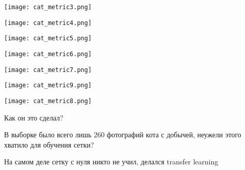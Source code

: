 \documentclass[notes,12pt, aspectratio=169]{beamer}
\newenvironment{wideitemize}{\itemize\addtolength{\itemsep}{10pt}}{\enditemize}
\begin{document}
\begin{frame}
\begin{center}
	\texttt{[image: cat\_metric3.png]}
\end{center}
\end{frame}


\begin{frame}
\begin{center}
	\texttt{[image: cat\_metric4.png]}
\end{center}
\end{frame}


\begin{frame}
\begin{center}
	\texttt{[image: cat\_metric5.png]}
\end{center}
\end{frame}


\begin{frame}
\begin{center}
	\texttt{[image: cat\_metric6.png]}
\end{center}
\end{frame}


\begin{frame}
\begin{center}
	\texttt{[image: cat\_metric7.png]}
\end{center}
\end{frame}


\begin{frame}
\begin{center}
	\texttt{[image: cat\_metric9.png]}
\end{center}
\end{frame}


\begin{frame}
\begin{center}
	\texttt{[image: cat\_metric8.png]}
\end{center}
\end{frame}


\begin{frame}{Как он это сделал?}
\begin{wideitemize}
	\item   В выборке было всего лишь $260$ фотографий кота с добычей, неужели этого хватило для обучения сетки? 
	
	\item  На самом деле сетку с нуля никто не учил, делался transfer learning
\end{wideitemize}
\end{frame}
\end{document}
